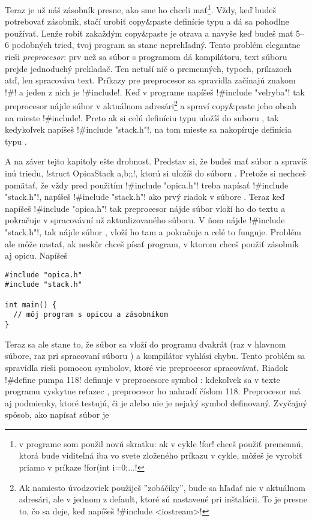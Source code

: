 Teraz je už náš zásobník presne, ako sme ho chceli mať\footnote{%
  v programe som použil novú skratku: ak v cykle \prg!for! chceš použiť
  premennú, ktorá bude viditeľná iba vo svete zloženého príkazu v cykle,
  môžeš je vyrobiť priamo v príkaze \prg!for(int i=0;...!}.
Vždy, keď budeš potrebovať zásobník, stačí urobiť copy\&paste definície
typu  a dá sa pohodlne používať. Lenže robiť zakaždým copy\&paste
je otrava a navyše keď budeš mať 5--6 podobných tried, tvoj program sa stane
neprehľadný. Tento problém elegantne rieši {\em preprocesor}: prv než
sa súbor s programom dá kompilátoru, text súboru prejde jednoduchý prekladač.
Ten netuší nič o premenných, typoch, príkazoch atď, len spracováva text. 
Príkazy pre preprocesor sa spravidla začínajú znakom \prg!#! a jeden z nich je
\prg!#include!. Keď v programe napíšeš \prg!#include "velryba"! tak preprocesor
nájde súbor  v aktuálnom adresári\footnote{Ak namiesto úvodzoviek použiješ
''zobáčiky'', bude sa hľadať nie v aktuálnom adresári, ale v jednom z default, ktoré
sú nastavené pri inštalácii. To je presne to, čo sa deje, keď napíšeš 
\prg!#include <iostream>!} a spraví copy\&paste jeho obsah na mieste \prg!#include!.
Preto ak si celú definíciu typu  uložíš do suboru , tak
kedykoľvek napíšeš \prg!#include "stack.h"!, na tom mieste sa nakopíruje 
definícia typu .


A na záver tejto kapitoly ešte drobnosť. Predstav si, že budeš mať súbor 
a spravíš inú triedu, \prg!struct Opica{Stack a,b;};!, ktorú si uložíš do súboru
. Pretože si nechceš pamätať, že vždy pred použitím \prg!#include "opica.h"!
treba napísať \prg!#include "stack.h"!, napíšeš \prg!#include "stack.h"! ako prvý riadok v 
súbore . Teraz keď napíšeš \prg!#include "opica.h"! tak preprocesor nájde súbor
 vloží ho do textu a pokračuje v spracovávní už aktualizovaného súboru. V ňom
nájde \prg!#include "stack.h"!, tak nájde súbor , vloží ho tam a pokračuje
a celé to funguje. Problém ale môže nastať, ak neskôr chceš písať program, v ktorom chceš
použiť zásobník aj opicu. Napíšeš


\begin{lstlisting}[] 
#include "opica.h"
#include "stack.h"

int main() {
  // môj program s opicou a zásobníkom
}
\end{lstlisting}

Teraz sa ale stane to, že súbor  sa vloží do programu dvakrát (raz v 
hlavnom súbore, raz pri spracovaní súboru ) a kompilátor vyhlási chybu. Tento
problém sa spravidla rieši pomocou symbolov, ktoré vie preprocesor spracovávať.
Riadok \prg!#define pumpa 118! definuje v preprocesore symbol : 
kdekoľvek sa v texte programu vyskytne reťazec  , preprocesor ho nahradí 
číslom 118. Preprocesor má aj podmienky, ktoré testujú, či je alebo nie je
nejaký symbol definovaný. 
Zvyčajný spôsob, ako napísať súbor  je

